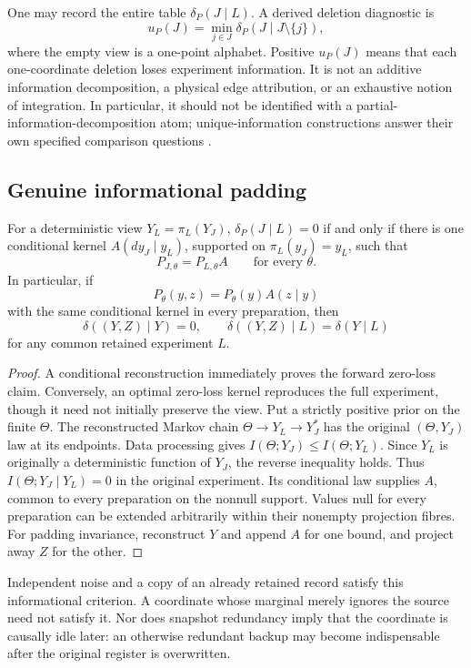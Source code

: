 One may record the entire table \(\delta_P(J\mid L)\). A derived deletion diagnostic is
\begin{equation}\label{eq:deletion-u}
 u_P(J)=\min_{j\in J}\delta_P(J\mid J\setminus\{j\}),
\end{equation}
where the empty view is a one-point alphabet. Positive \(u_P(J)\) means that each one-coordinate deletion loses experiment information. It is not an additive information decomposition, a physical edge attribution, or an exhaustive notion of integration. In particular, it should not be identified with a partial-information-decomposition atom; unique-information constructions answer their own specified comparison questions \cite{BertschingerEtAl2014}.

\subsection{Genuine informational padding}
\begin{proposition}\label{p2-07}
For a deterministic view \(Y_L=\pi_L(Y_J)\), \(\delta_P(J\mid L)=0\) if and only if there is one conditional kernel \(A(dy_J\mid y_L)\), supported on \(\pi_L(y_J)=y_L\), such that
\begin{equation}\label{eq:sufficiency}
 P_{J,\theta}=P_{L,\theta}A\qquad\text{for every }\theta.
\end{equation}
In particular, if
\begin{equation}\label{eq:padding}
 P_\theta(y,z)=P_\theta(y)A(z\mid y)
\end{equation}
with the same conditional kernel in every preparation, then
\begin{equation}\label{eq:padding-invariance}
 \delta((Y,Z)\mid Y)=0,
 \qquad
 \delta((Y,Z)\mid L)=\delta(Y\mid L)
\end{equation}
for any common retained experiment \(L\).
\end{proposition}
\begin{proof}
A conditional reconstruction immediately proves the forward zero-loss claim. Conversely, an optimal zero-loss kernel reproduces the full experiment, though it need not initially preserve the view. Put a strictly positive prior on the finite \(\Theta\). The reconstructed Markov chain \(\Theta\to Y_L\to Y_J^*\) has the original \((\Theta,Y_J)\) law at its endpoints. Data processing gives
\(I(\Theta;Y_J)\le I(\Theta;Y_L)\). Since \(Y_L\) is originally a deterministic function of \(Y_J\), the reverse inequality holds. Thus \(I(\Theta;Y_J\mid Y_L)=0\) in the original experiment. Its conditional law supplies \(A\), common to every preparation on the nonnull support. Values null for every preparation can be extended arbitrarily within their nonempty projection fibres. For padding invariance, reconstruct \(Y\) and append \(A\) for one bound, and project away \(Z\) for the other.
\end{proof}
Independent noise and a copy of an already retained record satisfy this informational criterion. A coordinate whose marginal merely ignores the source need not satisfy it. Nor does snapshot redundancy imply that the coordinate is causally idle later: an otherwise redundant backup may become indispensable after the original register is overwritten.

